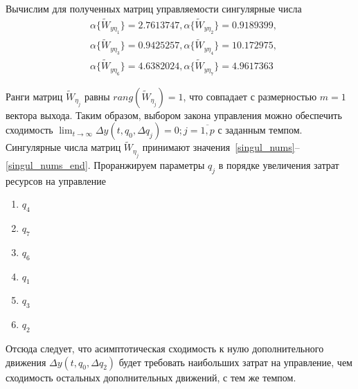Вычислим для полученных матриц управляемости сингулярные числа
\begin{align}\label{singul_nums}
	&\alpha\{\tilde{W}_{y \eta_{1}}\} = 2.7613747,
	\alpha\{\tilde{W}_{y \eta_{2}}\} = 0.9189399,\\	
	&\alpha\{\tilde{W}_{y \eta_{3}}\} = 0.9425257,	
	\alpha\{\tilde{W}_{y \eta_{4}}\} = 10.172975,\\		
	&\alpha\{\tilde{W}_{y \eta_{6}}\} = 4.6382024,
	\alpha\{\tilde{W}_{y \eta_{7}}\} = 4.9617363
	\label{singul_nums_end}
\end{align}



Ранги матриц $\tilde{W}_{\eta_j}$ равны $rang(\tilde{W}_{\eta_j}) = 1$, что совпадает с размерностью $m = 1$ вектора выхода. Таким образом, выбором закона
управления можно обеспечить сходимость $\lim_{t  \to \infty} \Delta y (t,q_0,\Delta q_j) = 0; j = \overline{1, p}$ с заданным темпом. 
Сингулярные числа матриц $\tilde{W}_{\eta_j}$ принимают значения~\ref{singul_nums}--\ref{singul_nums_end}. Проранжируем параметры $q_j$ в порядке увеличения затрат ресурсов на управление
\begin{enumerate}
	\item $q_4$
	\item $q_7$
	\item $q_6$
	\item $q_1$
	\item $q_3$
	\item $q_2$			
\end{enumerate}

Отсюда следует, что асимптотическая сходимость к нулю дополнительного движения $\Delta y (t,q_0,\Delta q_2)$ будет требовать наибольших затрат на управление, чем сходимость остальных дополнительных движений, с тем же темпом.

\newpage